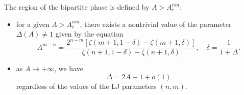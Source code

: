\documentclass[10pt,a4paper]{amsart}
\begin{document}
\begin{prop}
The region of the bipartite phase is defined by $A>A_c^{nm}$:  
\begin{itemize}
\item[(1)]
for a given $A>A_c^{nm}$, there exists a nontrivial value of the parameter
$\Delta(A)\ne 1$ given by the equation
\begin{equation} \label{adel}
A^{m-n}=\frac{2^{n-m}[\zeta(m+1,1-\delta)-\zeta(m+1,\delta)]}{
\zeta(n+1,1-\delta)-\zeta(n+1,\delta)},\quad \delta=\frac{1}{1+\Delta}.
\end{equation}
\item[(2)] as $A\to +\infty$, we have
\begin{equation} \label{deltaas}
\Delta = 2A - 1 + o(1)
\end{equation}
regardless of the values of the LJ parameters $(n,m)$.
\end{itemize}
\end{prop}
\end{document}
